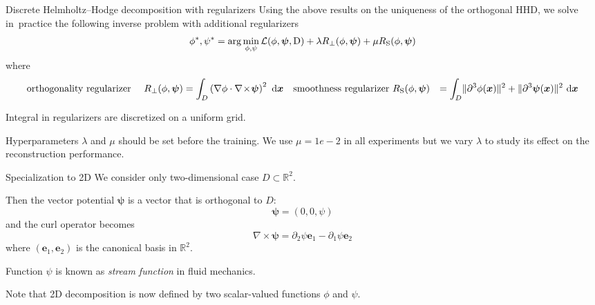 \documentclass[11pt,aspectratio=169,t]{beamer}
\def\\{}%
\renewcommand{\vec}[1]{\boldsymbol{#1}}
\newcommand{\R}{\mathbb R}
\DeclarePairedDelimiter\norm{\lVert}{\rVert}
\newcommand{\dd}{\,\textrm{d}}
\newcommand{\Grad}{\nabla}
\newcommand{\Curl}{\nabla \! \times \!}
\newcommand{\xx}{\vec{x}}
\begin{document}
\begin{frame}{Discrete Helmholtz--Hodge decomposition with regularizers}
Using the above results on the uniqueness of the orthogonal HHD, we solve
in~practice the following inverse problem with additional regularizers
\[
\phi^{*}, \psi^{*} =
\arg \min_{\phi, \psi} \mathcal L(\phi, \vec \psi, \mathrm D)
  + \lambda R_{\perp}(\phi, \vec \psi) + \mu R_{\text S}(\phi, \vec \psi)
\]
where
\begin{align*}
&\text{orthogonality regularizer }
&R_{\perp}(\phi, \vec \psi) &=
    \int_{D} \left(\Grad \phi \cdot \Curl \vec \psi \right)^{2} \, \dd \xx \\
&\text{smoothness regularizer }
&R_{\text S}(\phi, \vec \psi) &=
    \int_{D} \norm{\partial^{3}\phi(\xx)}^{2} + \norm{\partial^{3}\vec \psi(\xx)}^{2} \, \dd \xx
\end{align*}

Integral in regularizers are discretized on a uniform grid.

Hyperparameters $\lambda$ and $\mu$ should be set before the training.
We use $\mu=1e-2$ in all experiments but we vary $\lambda$ to study its effect
on the reconstruction performance.

\end{frame}

\begin{frame}{Specialization to 2D}
We consider only two-dimensional case $D \subset \R^{2}$.

Then the vector potential $\vec \psi$ is a vector that is orthogonal to $D$:
\[
 \vec \psi = (0, 0, \psi)
\]
and the curl operator becomes
\[
\Curl \vec \psi = \partial_{2} \psi \vec e_{1} - \partial_{1} \psi \vec e_{2}
\]
where $(\vec e_{1}, \vec e_{2})$ is the canonical basis in $\R^{2}$.

Function $\psi$ is known as \emph{stream function} in fluid mechanics.

Note that 2D decomposition is now defined by two scalar-valued functions $\phi$
and $\psi$.
\end{frame}
\end{document}
